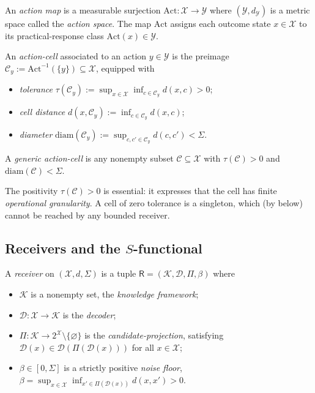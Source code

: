 \documentclass[11pt,twocolumn,a4paper]{article}
\newcommand{\K}{\mathcal{K}}
\newcommand{\D}{\mathcal{D}}
\newcommand{\X}{\mathcal{X}}
\newcommand{\Y}{\mathcal{Y}}
\newcommand{\Cell}{\mathcal{C}}
\newcommand{\receiver}{\mathsf{R}}
\newcommand{\diam}{\mathrm{diam}}
\newcommand{\Action}{\mathrm{Act}}
\begin{document}
\begin{definition}\label{def:action}
An \emph{action map} is a measurable surjection $\Action:\X\to\Y$ where
$(\Y,d_\Y)$ is a metric space called the \emph{action space}. The map
$\Action$ assigns each outcome state $x\in\X$ to its practical-response
class $\Action(x)\in\Y$.
\end{definition}

\begin{definition}\label{def:cell}
An \emph{action-cell} associated to an action $y\in\Y$ is the preimage
$\Cell_y:=\Action^{-1}(\{y\})\subseteq\X$, equipped with
\begin{itemize}[leftmargin=*]
\item \emph{tolerance} $\tau(\Cell_y):=\sup_{x\in\X}\inf_{c\in\Cell_y}
d(x,c)>0$;
\item \emph{cell distance} $d(x,\Cell_y):=\inf_{c\in\Cell_y}d(x,c)$;
\item \emph{diameter} $\diam(\Cell_y):=\sup_{c,c'\in\Cell_y}d(c,c')<\Sigma$.
\end{itemize}
A \emph{generic action-cell} is any nonempty subset $\Cell\subseteq\X$
with $\tau(\Cell)>0$ and $\diam(\Cell)<\Sigma$.
\end{definition}

\begin{remark}\label{rem:cell-positivity}
The positivity $\tau(\Cell)>0$ is essential: it expresses that the cell
has finite \emph{operational granularity}. A cell of zero tolerance is a
singleton, which (by  below) cannot be reached by any
bounded receiver.
\end{remark}

\subsection{Receivers and the $S$-functional}

\begin{definition}[Receiver]\label{def:receiver}
A \emph{receiver} on $(\X,d,\Sigma)$ is a tuple
$\receiver=(\K,\D,\Pi,\beta)$ where
\begin{itemize}[leftmargin=*]
\item $\K$ is a nonempty set, the \emph{knowledge framework};
\item $\D:\X\to\K$ is the \emph{decoder};
\item $\Pi:\K\to 2^\X\setminus\{\varnothing\}$ is the
\emph{candidate-projection}, satisfying
$\D(x)\in\D(\Pi(\D(x)))$ for all $x\in\X$;
\item $\beta\in[0,\Sigma]$ is a strictly positive \emph{noise floor},
$\beta=\sup_{x\in\X}\inf_{x'\in\Pi(\D(x))}d(x,x')>0$.
\end{itemize}
\end{definition}
\end{document}
